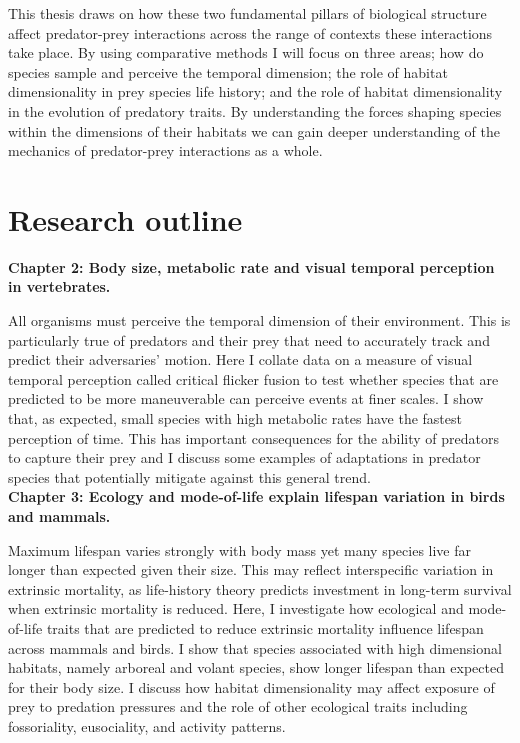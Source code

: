 This thesis draws on how these two fundamental pillars of biological structure affect predator-prey interactions across the range of contexts these interactions take place. By using comparative methods I will focus on three areas; how do species sample and perceive the temporal dimension; the role of habitat dimensionality in prey species life history; and the role of habitat dimensionality in the evolution of predatory traits. By understanding the forces shaping species within the dimensions of their habitats we can gain deeper understanding of the mechanics of predator-prey interactions as a whole.\\


\section{\uppercase{R}esearch outline}


\textbf{Chapter 2: Body size, metabolic rate and visual temporal perception in vertebrates.}


 All organisms must perceive the temporal dimension of their environment. This is particularly true of predators and their prey that need to accurately track and predict their adversaries' motion. Here I collate data on a measure of visual temporal perception called critical flicker fusion to test whether species that are predicted to be more maneuverable can perceive events at finer scales. I show that, as expected, small species with high metabolic rates have the fastest perception of time. This has important consequences for the ability of predators to capture their prey and I discuss some examples of adaptations in predator species that potentially mitigate against this general trend.\\


\textbf{Chapter 3: Ecology and mode-of-life explain lifespan variation in birds and mammals.}


Maximum lifespan varies strongly with body mass yet many species live far longer than expected given their size. This may reflect interspecific variation in extrinsic mortality, as life-history theory predicts investment in long-term survival when extrinsic mortality is reduced. Here, I investigate how ecological and mode-of-life traits that are predicted to reduce extrinsic mortality influence lifespan across mammals and birds. I show that species associated with high dimensional habitats, namely arboreal and volant species, show longer lifespan than expected for their body size. I discuss how habitat dimensionality may affect exposure of prey to predation pressures and the role of other ecological traits including fossoriality, eusociality, and activity patterns.\\




